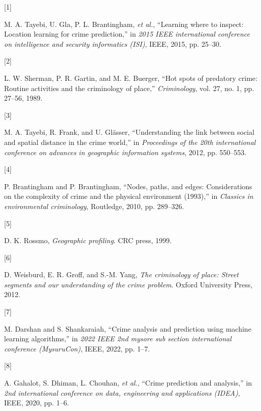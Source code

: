 \documentclass[11 pt,conference,final,]{IEEEtran}
\newlength{\cslhangindent}
\newlength{\csllabelwidth}
\newenvironment{CSLReferences}[2] %
 {\begin{list}{}{%
  \setlength{\itemindent}{0pt}
  \setlength{\leftmargin}{0pt}
  \setlength{\parsep}{0pt}
  \ifodd #1
   \setlength{\leftmargin}{\cslhangindent}
   \setlength{\itemindent}{-1\cslhangindent}
  \fi
  \setlength{\itemsep}{#2\baselineskip}}}
 {\end{list}}
\newcommand{\CSLLeftMargin}[1]{\parbox[t]{\csllabelwidth}{#1}}
\newcommand{\CSLRightInline}[1]{\parbox[t]{\linewidth - \csllabelwidth}{#1}\break}
\begin{document}
\label{refs}
\begin{CSLReferences}{0}{0}
\CSLLeftMargin{{[}1{]} }%
\CSLRightInline{M. A. Tayebi, U. Gla, P. L. Brantingham, \emph{et al.},
{``Learning where to inspect: Location learning for crime prediction,''}
in \emph{2015 IEEE international conference on intelligence and security
informatics (ISI)}, IEEE, 2015, pp. 25--30.}

\CSLLeftMargin{{[}2{]} }%
\CSLRightInline{L. W. Sherman, P. R. Gartin, and M. E. Buerger, {``Hot
spots of predatory crime: Routine activities and the criminology of
place,''} \emph{Criminology}, vol. 27, no. 1, pp. 27--56, 1989.}

\CSLLeftMargin{{[}3{]} }%
\CSLRightInline{M. A. Tayebi, R. Frank, and U. Glässer, {``Understanding
the link between social and spatial distance in the crime world,''} in
\emph{Proceedings of the 20th international conference on advances in
geographic information systems}, 2012, pp. 550--553.}

\CSLLeftMargin{{[}4{]} }%
\CSLRightInline{P. Brantingham and P. Brantingham, {``Nodes, paths, and
edges: Considerations on the complexity of crime and the physical
environment (1993),''} in \emph{Classics in environmental criminology},
Routledge, 2010, pp. 289--326.}

\CSLLeftMargin{{[}5{]} }%
\CSLRightInline{D. K. Rossmo, \emph{Geographic profiling}. CRC press,
1999.}

\CSLLeftMargin{{[}6{]} }%
\CSLRightInline{D. Weisburd, E. R. Groff, and S.-M. Yang, \emph{The
criminology of place: Street segments and our understanding of the crime
problem}. Oxford University Press, 2012.}

\CSLLeftMargin{{[}7{]} }%
\CSLRightInline{M. Darshan and S. Shankaraiah, {``Crime analysis and
prediction using machine learning algorithms,''} in \emph{2022 IEEE 2nd
mysore sub section international conference (MysuruCon)}, IEEE, 2022,
pp. 1--7.}

\CSLLeftMargin{{[}8{]} }%
\CSLRightInline{A. Gahalot, S. Dhiman, L. Chouhan, \emph{et al.},
{``Crime prediction and analysis,''} in \emph{2nd international
conference on data, engineering and applications (IDEA)}, IEEE, 2020,
pp. 1--6.}


\end{CSLReferences}
\end{document}
